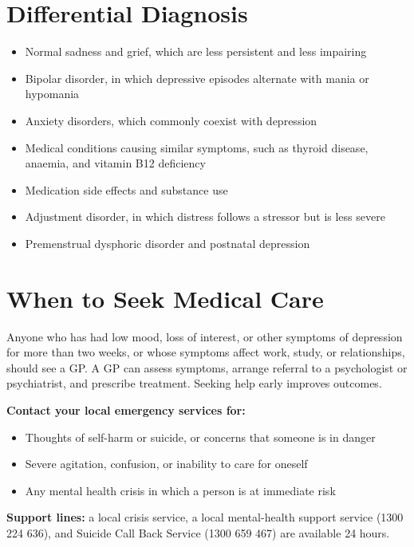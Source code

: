 \section*{Differential Diagnosis}
\begin{itemize}
    \item Normal sadness and grief, which are less persistent and less impairing
    \item Bipolar disorder, in which depressive episodes alternate with mania or hypomania
    \item Anxiety disorders, which commonly coexist with depression
    \item Medical conditions causing similar symptoms, such as thyroid disease, anaemia, and vitamin B12 deficiency
    \item Medication side effects and substance use
    \item Adjustment disorder, in which distress follows a stressor but is less severe
    \item Premenstrual dysphoric disorder and postnatal depression
\end{itemize}

\section*{When to Seek Medical Care}
Anyone who has had low mood, loss of interest, or other symptoms of depression for more than two weeks, or whose symptoms affect work, study, or relationships, should see a GP. A GP can assess symptoms, arrange referral to a psychologist or psychiatrist, and prescribe treatment. Seeking help early improves outcomes.

\textbf{Contact your local emergency services for:}
\begin{itemize}
    \item Thoughts of self-harm or suicide, or concerns that someone is in danger
    \item Severe agitation, confusion, or inability to care for oneself
    \item Any mental health crisis in which a person is at immediate risk
\end{itemize}
\textbf{Support lines:} a local crisis service, a local mental-health support service (1300 224 636), and Suicide Call Back Service (1300 659 467) are available 24 hours.

